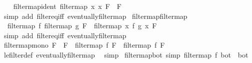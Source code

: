 \begin{isabellebody}
\ \ \isamarkupfalse%
%
\endisatagproof
{\isafoldproof}%
%
\isadelimproof
\isanewline
%
\endisadelimproof
\isanewline
{}\isamarkupfalse%
\ filtermap{\isacharunderscore}{\kern0pt}ident{\isacharcolon}{\kern0pt}\ {\isachardoublequoteopen}filtermap\ {\isacharparenleft}{\kern0pt}{\isasymlambda}x{\isachardot}{\kern0pt}\ x{\isacharparenright}{\kern0pt}\ F\ {\isacharequal}{\kern0pt}\ F{\isachardoublequoteclose}\isanewline
%
\isadelimproof
\ \ %
\endisadelimproof
%
\isatagproof
{}\isamarkupfalse%
\ {\isacharparenleft}{\kern0pt}simp\ add{\isacharcolon}{\kern0pt}\ filter{\isacharunderscore}{\kern0pt}eq{\isacharunderscore}{\kern0pt}iff\ eventually{\isacharunderscore}{\kern0pt}filtermap{\isacharparenright}{\kern0pt}%
\endisatagproof
{\isafoldproof}%
%
\isadelimproof
\isanewline
%
\endisadelimproof
\isanewline
{}\isamarkupfalse%
\ filtermap{\isacharunderscore}{\kern0pt}filtermap{\isacharcolon}{\kern0pt}\isanewline
\ \ {\isachardoublequoteopen}filtermap\ f\ {\isacharparenleft}{\kern0pt}filtermap\ g\ F{\isacharparenright}{\kern0pt}\ {\isacharequal}{\kern0pt}\ filtermap\ {\isacharparenleft}{\kern0pt}{\isasymlambda}x{\isachardot}{\kern0pt}\ f\ {\isacharparenleft}{\kern0pt}g\ x{\isacharparenright}{\kern0pt}{\isacharparenright}{\kern0pt}\ F{\isachardoublequoteclose}\isanewline
%
\isadelimproof
\ \ %
\endisadelimproof
%
\isatagproof
{}\isamarkupfalse%
\ {\isacharparenleft}{\kern0pt}simp\ add{\isacharcolon}{\kern0pt}\ filter{\isacharunderscore}{\kern0pt}eq{\isacharunderscore}{\kern0pt}iff\ eventually{\isacharunderscore}{\kern0pt}filtermap{\isacharparenright}{\kern0pt}%
\endisatagproof
{\isafoldproof}%
%
\isadelimproof
\isanewline
%
\endisadelimproof
\isanewline
{}\isamarkupfalse%
\ filtermap{\isacharunderscore}{\kern0pt}mono{\isacharcolon}{\kern0pt}\ {\isachardoublequoteopen}F\ {\isasymle}\ F{\isacharprime}{\kern0pt}\ {\isasymLongrightarrow}\ filtermap\ f\ F\ {\isasymle}\ filtermap\ f\ F{\isacharprime}{\kern0pt}{\isachardoublequoteclose}\isanewline
%
\isadelimproof
\ \ %
\endisadelimproof
%
\isatagproof
{}\isamarkupfalse%
\ le{\isacharunderscore}{\kern0pt}filter{\isacharunderscore}{\kern0pt}def\ eventually{\isacharunderscore}{\kern0pt}filtermap\ \isamarkupfalse%
\ simp%
\endisatagproof
{\isafoldproof}%
%
\isadelimproof
\isanewline
%
\endisadelimproof
\isanewline
{}\isamarkupfalse%
\ filtermap{\isacharunderscore}{\kern0pt}bot\ {\isacharbrackleft}{\kern0pt}simp{\isacharbrackright}{\kern0pt}{\isacharcolon}{\kern0pt}\ {\isachardoublequoteopen}filtermap\ f\ bot\ {\isacharequal}{\kern0pt}\ bot{\isachardoublequoteclose}\isanewline

\end{isabellebody}
